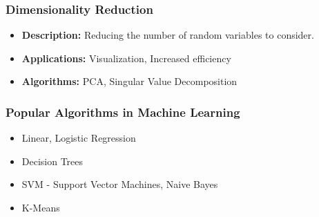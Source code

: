 \begin{frame}[fragile]\frametitle{Dimensionality Reduction}
\begin{itemize}
\item \textbf{Description: } Reducing the number of random variables to consider.
\item \textbf{Applications:} Visualization, Increased efficiency
\item \textbf{Algorithms:} PCA, Singular Value Decomposition 
\end{itemize}
\end{frame}

\begin{frame}[fragile]\frametitle{Popular Algorithms in Machine Learning}
	\begin{itemize}
	\item  Linear, Logistic Regression	
	\item  Decision Trees
	\item  SVM - Support Vector Machines, Naive Bayes
	\item K-Means
	\end{itemize}
\end{frame}


